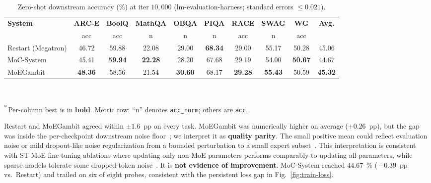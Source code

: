 \documentclass[10pt,conference]{IEEEtran}
\begin{document}
\begin{table}[!t]
\caption{Zero-shot downstream accuracy (\%) at iter $10{,}000$ (lm-evaluation-harness; standard errors $\leq 0.021$).}
\label{tab:downstream}
\setlength{\tabcolsep}{5pt}
\renewcommand{\arraystretch}{1.15}
\begin{center}
\small
\begin{tabular}{@{}l ccccccccc@{}}
\toprule
\textbf{System} & \textbf{ARC-E} & \textbf{BoolQ} & \textbf{MathQA} & \textbf{OBQA} & \textbf{PIQA} & \textbf{RACE} & \textbf{SWAG} & \textbf{WG} & \textbf{Avg.} \\
                & acc            & acc            & n               & n             & n             & acc           & n             & acc          &              \\
\midrule
Restart (Megatron)            & 46.72          & 59.88          & 22.08          & 29.00          & \textbf{68.34} & 29.00          & 55.17          & 50.28          & 45.06 \\
MoC-System~\cite{cai2024moc}  & 45.41          & \textbf{59.94} & \textbf{22.28} & 28.20          & 67.68          & 29.19          & 54.00          & \textbf{50.67} & 44.67 \\
MoEGambit                     & \textbf{48.36} & 58.56          & 21.54          & \textbf{30.60} & 68.17          & \textbf{29.28} & \textbf{55.43} & 50.59          & \textbf{45.32} \\
\bottomrule
\end{tabular}\\[2pt]
{\footnotesize\raggedright \textsuperscript{*}\,Per-column best is in \textbf{bold}. Metric row: ``n'' denotes \texttt{acc\_norm}; others are \texttt{acc}.\par}
\end{center}
\end{table}

Restart and MoEGambit agreed within $\pm 1.6$~pp on every task. MoEGambit was numerically higher on average ($+0.26$~pp), but the gap was inside the per-checkpoint downstream noise floor~\cite{biderman2023pythia}; we interpret it as \textbf{quality parity}. The small positive mean could reflect evaluation noise or mild dropout-like noise regularization from a bounded perturbation to a small expert subset~\cite{srivastava2014dropout,bishop1995noise}. This interpretation is consistent with ST-MoE fine-tuning ablations where updating only non-MoE parameters performs comparably to updating all parameters, while sparse models tolerate some dropped-token noise~\cite{zoph2022stmoe}. It is \textbf{not evidence of improvement}. MoC-System reached $44.67$~\% (\,$-0.39$~pp vs.\ Restart) and trailed on six of eight probes, consistent with the persistent loss gap in Fig.~\ref{fig:train-loss}.
\end{document}
